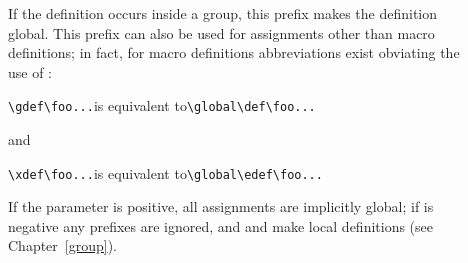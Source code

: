 \begin{description}
\item []
If the definition occurs inside a  group, this prefix
makes the definition global.
This prefix can also be used for assignments other than
macro definitions; in fact,
for macro definitions abbreviations exist obviating the
use of :
\begin{disp}\verb>\gdef\foo...>\quad is equivalent to\quad \verb>\global\def\foo...>
\end{disp} and
\begin{disp}\verb>\xdef\foo...>\quad is equivalent to\quad \verb>\global\edef\foo...>
\end{disp}

If the parameter 
is positive, all assignments are
implicitly global;
if\handbreak {} is negative any  prefixes are
ignored,
and  and  make local definitions
(see Chapter~\ref{group}).


\end{description}
